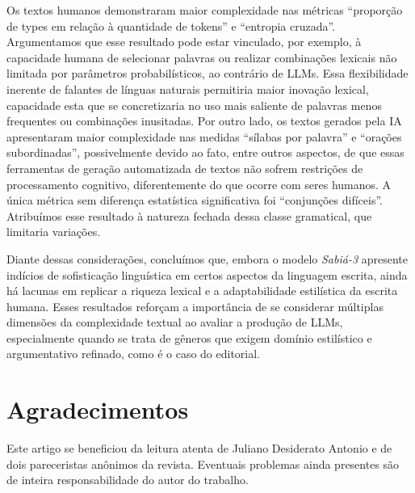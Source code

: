 \documentclass[portuguese]{textolivre}
\begin{document}
Os textos humanos demonstraram maior complexidade nas métricas ``proporção de types em relação à quantidade de tokens'' e ``entropia cruzada''.
Argumentamos que esse resultado pode estar vinculado, por exemplo, à capacidade humana de selecionar palavras ou realizar combinações lexicais não limitada por parâmetros probabilísticos, ao contrário de LLMs.
Essa flexibilidade inerente de falantes de línguas naturais permitiria maior inovação lexical, capacidade esta que se concretizaria no uso mais saliente de palavras menos frequentes ou combinações inusitadas.
Por outro lado, os textos gerados pela IA apresentaram maior complexidade nas medidas ``sílabas por palavra'' e ``orações subordinadas'', possivelmente devido ao fato, entre outros aspectos, de que essas ferramentas de geração automatizada de textos não sofrem restrições de processamento cognitivo, diferentemente do que ocorre com seres humanos.
A única métrica sem diferença estatística significativa foi ``conjunções difíceis''.
Atribuímos esse resultado à natureza fechada dessa classe gramatical, que limitaria variações.

Diante dessas considerações, concluímos que, embora o modelo \emph{Sabiá-3} apresente indícios de sofisticação linguística em certos aspectos da linguagem escrita, ainda há lacunas em replicar a riqueza lexical e a adaptabilidade estilística da escrita humana.
Esses resultados reforçam a importância de se considerar múltiplas dimensões da complexidade textual ao avaliar a produção de LLMs, especialmente quando se trata de gêneros que exigem domínio estilístico e argumentativo refinado, como é o caso do editorial.

\section{Agradecimentos}\label{sec-agradecimentos}
Este artigo se beneficiou da leitura atenta de Juliano Desiderato Antonio e de dois pareceristas anônimos da revista. Eventuais problemas ainda presentes são de inteira responsabilidade do autor do trabalho.

\printbibliography\label{sec-bib}

\end{document}
